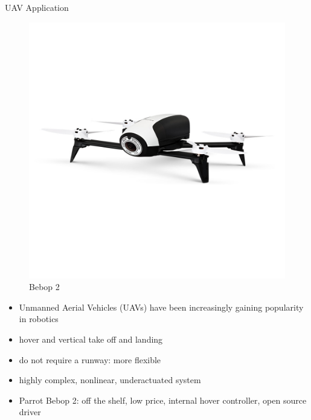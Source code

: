 \begin{frame}{UAV Application}
    \begin{minipage}{0.35\textwidth}
    \begin{figure}
        \centering
        \includegraphics[scale=0.1]{figuras/new_bebop2_branco.jpg}
        \caption{Bebop 2}
        \label{fig:bebop2}
    \end{figure}
    \end{minipage} \hfill
    \begin{minipage}{0.55\textwidth}
    \begin{itemize}
        \item Unmanned Aerial Vehicles (UAVs) have been increasingly gaining popularity in robotics
        \item hover and vertical take off and landing 
        \item do not require a runway: more flexible
        \item highly complex, nonlinear, underactuated system
        \item Parrot Bebop 2: off the shelf, low price, internal hover controller, open source driver 
    \end{itemize}
    \end{minipage}
\end{frame}

